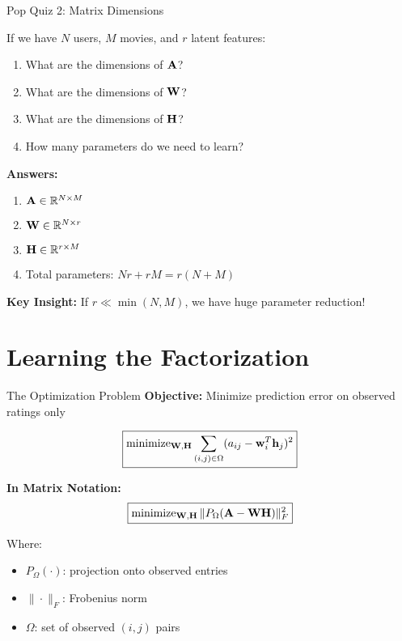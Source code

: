 \documentclass{beamer}
\begin{document}
\begin{frame}{Pop Quiz 2: Matrix Dimensions}
\begin{tcolorbox}[colback=green!5!white,colframe=green!75!black,title=Dimension Check]
If we have $N$ users, $M$ movies, and $r$ latent features:

\pause
\begin{enumerate}[<+->]
    \item What are the dimensions of $\mathbf{A}$? 
    \item What are the dimensions of $\mathbf{W}$?
    \item What are the dimensions of $\mathbf{H}$?
    \item How many parameters do we need to learn?
\end{enumerate}

\pause
\textbf{Answers:}
\begin{enumerate}
    \item $\mathbf{A} \in \mathbb{R}^{N \times M}$
    \item $\mathbf{W} \in \mathbb{R}^{N \times r}$ 
    \item $\mathbf{H} \in \mathbb{R}^{r \times M}$
    \item Total parameters: $Nr + rM = r(N + M)$
\end{enumerate}

\pause
\textbf{Key Insight:} If $r \ll \min(N,M)$, we have huge parameter reduction!
\end{tcolorbox}
\end{frame}

\section{Learning the Factorization}

\begin{frame}{The Optimization Problem}
\textbf{Objective:} Minimize prediction error on observed ratings only

\pause
\begin{equation*}
\boxed{\operatorname{minimize}_{\mathbf{W},\mathbf{H}} \sum_{(i,j) \in \Omega} (a_{ij} - \mathbf{w}_i^T \mathbf{h}_j)^2}
\end{equation*}

\pause
\textbf{In Matrix Notation:}
\begin{equation*}
\boxed{\operatorname{minimize}_{\mathbf{W},\mathbf{H}} \|P_\Omega(\mathbf{A} - \mathbf{W}\mathbf{H})\|_F^2}
\end{equation*}

\pause
Where:
\begin{itemize}[<+->]
    \item $P_\Omega(\cdot)$: projection onto observed entries
    \item $\|\cdot\|_F$: Frobenius norm
    \item $\Omega$: set of observed $(i,j)$ pairs
\end{itemize}
\end{frame}
\end{document}
